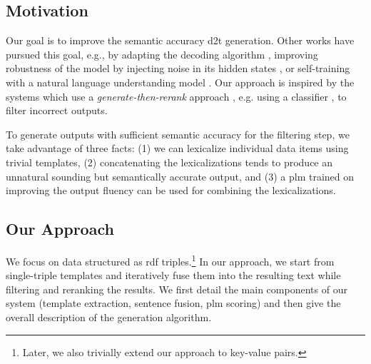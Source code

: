 \subsection{Motivation}
\label{sec:text-editing}
Our goal is to improve the semantic accuracy \ac{d2t} generation. Other works have pursued this goal, e.g., by adapting the decoding algorithm \cite{tianStickingFactsConfident2020}, improving robustness of the model by injecting noise in its hidden states \cite{kedzie_good_2019}, or self-training with a natural language understanding model \cite{nieSimpleRecipeReducing2019}. Our approach is inspired by the systems which use a \emph{generate-then-rerank} approach \citep{dusekSequencetoSequenceGenerationSpoken2016,juraska_deep_2018}, e.g. using a classifier \cite{harkousHaveYourText2020}, to filter incorrect outputs.

To generate outputs with sufficient semantic accuracy for the filtering step, we take advantage of three facts: (1) we can lexicalize individual data items using trivial templates, (2) concatenating the lexicalizations tends to produce an unnatural sounding but semantically accurate output, and (3) a \ac{plm} trained on improving the output fluency can be used for combining the lexicalizations.




\subsection{Our Approach}
\label{sec:text-editing-exp}
We focus on data structured as \ac{rdf} triples.\footnote{Later, we also trivially extend our approach to key-value pairs.} In our approach, we start from single-triple templates and iteratively fuse them into the resulting text while filtering and reranking the results. We first detail the main components of our system (template extraction, sentence fusion, \ac{plm} scoring) and then give the overall description of the generation algorithm.

